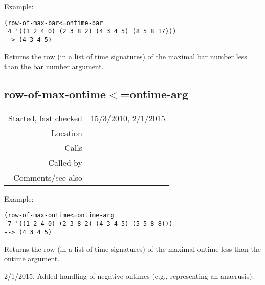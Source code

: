 \vspace{0.5cm}
\noindent Example:
\begin{verbatim}
(row-of-max-bar<=ontime-bar
 4 '((1 2 4 0) (2 3 8 2) (4 3 4 5) (8 5 8 17)))
--> (4 3 4 5)
\end{verbatim}

\noindent Returns the row (in a list of time
signatures) of the maximal bar number less than the
bar number argument.


\subsection*{row-of-max-ontime$<$=ontime-arg}\label{fun:row-of-max-ontime<=ontime-arg}

\vspace{0.3cm}
\begin{tabular}{r|p{8cm}}
Started, last checked & 15/3/2010, 2/1/2015 \\
Location & \nameref{sec:ontimes-signatures} \\
Calls & \\
Called by & \nameref{fun:bar-n-beat-number-of-ontime} \\
Comments/see also & 
\end{tabular}

\vspace{0.5cm}
\noindent Example:
\begin{verbatim}
(row-of-max-ontime<=ontime-arg
 7 '((1 2 4 0) (2 3 8 2) (4 3 4 5) (5 5 8 8)))
--> (4 3 4 5)
\end{verbatim}

\noindent Returns the row (in a list of time
signatures) of the maximal ontime less than the
ontime argument.

2/1/2015. Added handling of negative ontimes
(e.g., representing an anacrusis).


















